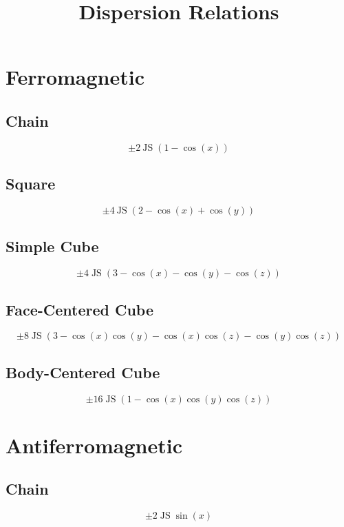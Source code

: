 \documentclass[aps,prl,preprint,groupedaddress]{revtex4}
\begin{document}
\title{Dispersion Relations}

\section{Ferromagnetic}
\subsection{Chain}
\begin{equation}
\pm 2 \: \mathrm{JS} \; (1 - \cos(x))
\label{eq:fmc}
\end{equation}

\subsection{Square}
\begin{equation}
\pm 4 \: \mathrm{JS} \; (2 - \cos(x) + \cos(y))
\label{eq:fmsq}
\end{equation}

\subsection{Simple Cube}
\begin{equation}
\pm 4 \; \mathrm{JS} \; (3 - \cos(x) - \cos(y) - \cos(z))
\label{eq:fmsc}
\end{equation}

\subsection{Face-Centered Cube}
\begin{equation}
\pm 8 \; \mathrm{JS} \; (3 - \cos(x) \cos(y) - \cos(x) \cos(z) - \cos(y) \cos(z))
\label{eq:fmfcc}
\end{equation}

\subsection{Body-Centered Cube}
\begin{equation}
\pm 16 \; \mathrm{JS} \; (1 - \cos(x) \cos(y) \cos(z))
\label{eq:fmbcc}
\end{equation}

\section{Antiferromagnetic}
\subsection{Chain}
\begin{equation}
\pm 2 \; \mathrm{JS} \; \sin(x)
\label{eq:afmc}
\end{equation}
\end{document}
